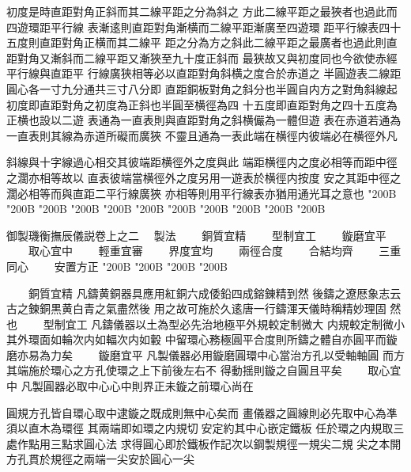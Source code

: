 \begin{正文}
初度是時直距對角正斜而其二線平距之分為斜之
方此二線平距之最狹者也過此而四遊環距平行線
表漸逺則直距對角漸横而二線平距漸廣至四遊環
距平行線表四十五度則直距對角正横而其二線平
距之分為方之斜此二線平距之最廣者也過此則直
距對角又漸斜而二線平距又漸狹至九十度正斜而
最狹故又與初度同也今欲使赤經平行線與直距平
行線廣狹相等必以直距對角斜横之度合於赤道之
半圓遊表二線距圓心各一寸九分通共三寸八分即
直距銅板對角之斜分也半圓自内方之對角斜線起
初度即直距對角之初度為正斜也半圓至横徑為四
十五度即直距對角之四十五度為正横也設以二遊
表通為一直表則與直距對角之斜横儼為一體但遊
表在赤道若通為一直表則其線為赤道所礙而廣狹
不靈且通為一表此端在横徑内彼端必在横徑外凡
\par
斜線與十字線過心相交其彼端距横徑外之度與此
端距横徑内之度必相等而距中徑之濶亦相等故以
直表彼端當横徑外之度另用一遊表於横徑内按度
安之其距中徑之濶必相等而與直距二平行線廣狹
亦相等則用平行線表亦猶用通光耳之意也
\char"200B\relax{}
\char"200B\relax{}
\char"200B\relax{}
\char"200B\relax{}
\char"200B\relax{}
\char"200B\relax{}
\char"200B\relax{}
\char"200B\relax{}
\char"200B\relax{}
\char"200B\relax{}
\char"200B\relax
\par
御製璣衡撫辰儀説卷上之二
　製法
　　銅質宜精
　　型制宜工
　　鏇磨宜平
　　取心宜中
　　輕重宜審
　　界度宜均
　　兩徑合度
　　合結均齊
　　三重同心
　　安置方正
\char"200B\relax{}
\char"200B\relax{}
\char"200B\relax{}
\char"200B\relax
\par
　　銅質宜精
凡鑄黄銅器具應用紅銅六成倭鉛四成鎔錬精到然
後鑄之遼厯象志云古之鍊銅黒黄白青之氣盡然後
用之故可施於久逺唐一行鑄渾天儀時稱精妙理固
然也
　　型制宜工
凡鑄儀器以土為型必先治地極平外規較定制微大
内規較定制微小其外環面如輪次内如輻次内如轂
中留環心務極圓平合度則所鑄之體自亦圓平而鏇
磨亦易為力矣
　　鏇磨宜平
凡製儀器必用鏇磨圓環中心當治方孔以受軸軸圓
而方其端施於環心之方孔使環之上下前後左右不
得動揺則鏇之自圓且平矣
　　取心宜中
凡製圓器必取中心心中則界正未鏇之前環心尚在
\par
圓規方孔皆自環心取中逮鏇之既成則無中心矣而
畫儀器之圓線則必先取中心為凖須以直木為環徑
其兩端即如環之内規切𦂳安定約其中心嵌定鐵板
任於環之内規取三處作點用三點求圓心法
求得圓心即於鐵板作記次以鋼製規徑一規尖二規
尖之本開方孔貫於規徑之兩端一尖安於圓心一尖

\end{正文}
